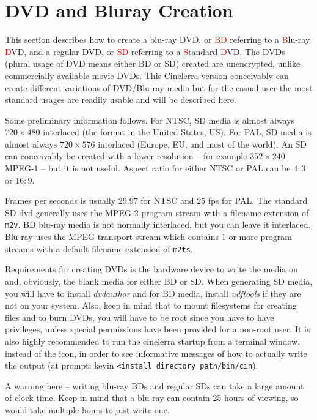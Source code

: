 \chapter{DVD and Bluray Creation}%
\label{cha:dvd_bluray_creation}

This section describes how to create a blu-ray DVD, or \textcolor{red}{BD} referring to a \textcolor{red}{B}lu-ray \textcolor{red}{D}VD, and a regular DVD, or \textcolor{red}{SD} referring to a \textcolor{red}{S}tandard \textcolor{red}{D}VD.  The DVDs (plural usage of DVD means either BD or SD) created are unencrypted, unlike commercially available movie DVDs.  This Cinelerra version conceivably can create different variations of DVD/Blu-ray media but for the casual user the most standard usages are readily usable and will be described here. 

Some preliminary information follows.  For NTSC, SD media is almost always $720\times480$ interlaced (the format in the United States, US).  For PAL, SD media is almost always $720\times576$ interlaced (Europe, EU, and most of the world).  An SD can conceivably be created with a lower resolution – for example $352\times240$ MPEG-1 -- but it is not useful.  Aspect ratio for either NTSC or PAL can be $4:3$ or $16:9$.  

Frames per seconds is usually $29.97$ for NTSC and $25$ fps for PAL.  The standard SD dvd generally uses the MPEG-2 program stream with a filename extension of \texttt{m2v}.  BD blu-ray media is not normally interlaced, but you can leave it interlaced.  Blu-ray uses the MPEG transport stream which contains 1 or more program streams with a default filename extension of \texttt{m2ts}.

Requirements for creating DVDs is the hardware device to write the media on and, obviously, the blank media for either BD or SD.  When generating SD media, you will have to install \textit{dvdauthor} and for BD media, install \textit{udftools} if they are not on your system.  Also, keep in mind that to mount filesystems for creating files and to burn DVDs, you will have to be root since you have to have privileges, unless special permissions have been provided for a non-root user.  It is also highly recommended to
run the cinelerra startup from a terminal window, instead of the icon, in order to see informative messages of how to actually write the output (at prompt: keyin \texttt{<install\_directory\_path/bin/cin}).

A warning here -- writing blu-ray BDs and  regular SDs can take a large amount of clock time.  Keep in mind that a blu-ray can contain 25 hours of viewing, so would take multiple hours to just write one.

